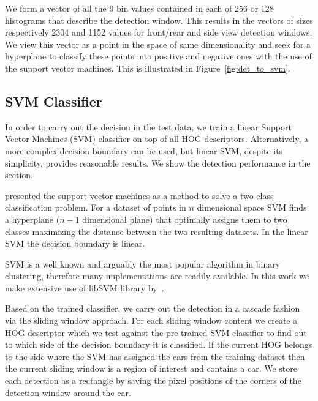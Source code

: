 We form a vector of all the 9 bin values contained in each of 256 or 128
histograms that describe the detection window. This results in the vectors of
sizes respectively 2304 and 1152 values for front/rear and side view detection
windows. We view this vector as a point in the space of same dimensionality
and seek for a hyperplane to classify these points into positive and negative
ones with the use of the support vector machines. This is illustrated in
Figure~\ref{fig:det_to_svm}.


\subsection{SVM Classifier}\label{sub:svm_classifier}

In order to carry out the decision in the test data, we train a linear Support
Vector Machines (SVM) classifier on top of all HOG descriptors. Alternatively,
a more complex decision boundary can be used, but linear SVM, despite its
simplicity, provides reasonable results. We show the detection performance in
the  section.

\citet{svm} presented the support vector machines as a method to solve a two
class classification problem. For a dataset of points in $n$ dimensional space
SVM finds a hyperplane ($n-1$ dimensional plane) that optimally assigns them
to two classes maximizing the distance between the two resulting datasets. In
the linear SVM the decision boundary is linear.

SVM is a well known and arguably the most popular algorithm in binary
clustering, therefore many implementations are readily available. In this work
we make extensive use of libSVM library by~\citet{libSVM2011}.

Based on the trained classifier, we carry out the detection in a cascade
fashion via the sliding window approach. For each sliding window content we
create a HOG descriptor which we test against the pre-trained SVM classifier
to find out to which side of the decision boundary it is classified. If the
current HOG belongs to the side where the SVM has assigned the cars from the
training dataset then the current sliding window is a region of interest and
contains a car. We store each detection as a rectangle by saving the pixel
positions of the corners of the detection window around the car.


